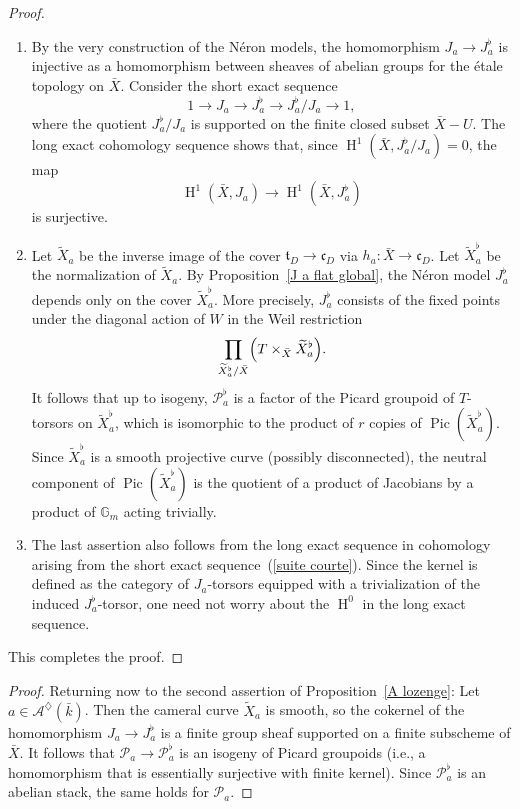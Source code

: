 \documentclass[12pt,english]{smfart}
\numberwithin{equation}{subsection}
\theoremstyle{remark}
\begin{document}
\begin{proof}
\begin{enumerate}
\item By the very construction of the N\'eron models, the homomorphism $J_a\rightarrow J_a^\flat$
is injective as a homomorphism between sheaves of abelian groups for the \'etale topology on $\bar X$.
Consider the short exact sequence
\begin{equation}\label{suite courte}
1\rightarrow J_a \rightarrow J_a^\flat \rightarrow J_a^\flat/J_a \rightarrow 1,
\end{equation}
where the quotient $J_a^\flat/J_a$ is supported on the finite closed subset $\bar X-U$.
The long exact cohomology sequence shows that, since $\operatorname{H}^1(\bar X,J_a^\flat/J_a)=0$, the map
$$
\operatorname{H}^1(\bar X,J_a)\longrightarrow \operatorname{H}^1(\bar X,J_a^\flat)
$$
is surjective.

\item Let $\widetilde X_a$ be the inverse image of the cover $\mathfrak{t}_D\rightarrow \mathfrak{c}_D$ via $h_a:\bar X\rightarrow \mathfrak{c}_D$.
Let $\widetilde X_a^\flat$ be the normalization of $\widetilde X_a$.
By Proposition~\ref{J a flat global}, the N\'eron model $J_a^\flat$ depends only on the cover $\widetilde X_a^\flat$.
More precisely, $J_a^\flat$ consists of the fixed points under the diagonal action of $W$ in the Weil restriction
$$
\prod_{\widetilde X_a^\flat/\bar X}\Bigl(T\times_{\bar X}\widetilde X_a^\flat\Bigr).
$$
It follows that up to isogeny, $\mathcal{P}_a^\flat$ is a factor of the Picard groupoid of $T$-torsors on $\widetilde X_a^\flat$,
which is isomorphic to the product of $r$ copies of $\operatorname{Pic}(\widetilde X_a^\flat)$.
Since $\widetilde X_a^\flat$ is a smooth projective curve (possibly disconnected), the neutral component
of $\operatorname{Pic}(\widetilde X_a^\flat)$ is the quotient of a product of Jacobians by a product of $\mathbb{G}_m$
acting trivially.

\item The last assertion also follows from the long exact sequence in cohomology arising from the short exact sequence~(\ref{suite courte}).
Since the kernel is defined as the category of $J_a$-torsors equipped with a trivialization of the induced $J_a^\flat$-torsor,
one need not worry about the $\operatorname{H}^0$ in the long exact sequence.
\end{enumerate}
This completes the proof.
\end{proof}

\begin{proof}
Returning now to the second assertion of Proposition~\ref{A lozenge}:
Let $a\in\mathcal{A}^\diamondsuit(\bar{k})$. Then the cameral curve $\widetilde X_a$ is smooth, so the cokernel
of the homomorphism $J_a\rightarrow J_a^\flat$ is a finite group sheaf supported on a finite subscheme of $\bar X$.
It follows that $\mathcal{P}_a\rightarrow \mathcal{P}_a^\flat$ is an isogeny of Picard groupoids (i.e., a homomorphism that is essentially surjective
with finite kernel). Since $\mathcal{P}_a^\flat$ is an abelian stack, the same holds for $\mathcal{P}_a$.
\end{proof}
\end{document}
